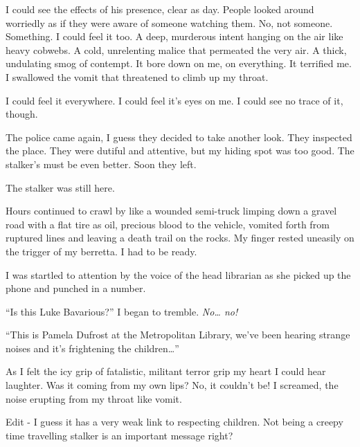 I could see the effects of his presence, clear as day. People
looked around worriedly as if they were aware of someone watching
them. No, not someone. Something. I could feel it too. A deep,
murderous intent hanging on the air like heavy cobwebs. A cold,
unrelenting malice that permeated the very air. A thick, undulating
smog of contempt. It bore down on me, on everything. It terrified
me. I swallowed the vomit that threatened to climb up my
throat.



I could feel it everywhere. I could feel it's eyes on me. I could
see no trace of it, though.



The police came again, I guess they decided to take another look.
They inspected the place. They were dutiful and attentive, but my
hiding spot was too good. The stalker's must be even better. Soon
they left.



The stalker was still here.



Hours continued to crawl by like a wounded semi-truck limping down
a gravel road with a flat tire as oil, precious blood to the
vehicle, vomited forth from ruptured lines and leaving a death
trail on the rocks. My finger rested uneasily on the trigger of my
berretta. I had to be ready.



I was startled to attention by the voice of the head librarian as
she picked up the phone and punched in a number.



``Is this Luke Bavarious?'' I began to tremble. {\em No{\ldots}
no!}



``This is Pamela Dufrost at the Metropolitan Library, we've been
hearing strange noises and it's frightening the
children{\ldots}''



As I felt the icy grip of fatalistic, militant terror grip my heart
I could hear laughter. Was it coming from my own lips? No, it
couldn't be! I screamed, the noise erupting from my throat
like vomit.





Edit - I guess it has a very weak link to respecting children. Not
being a creepy time travelling stalker is an important message
right? 
 



